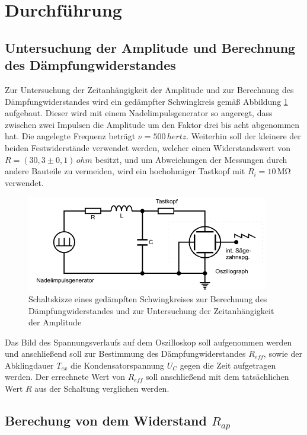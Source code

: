 \section{Durchführung}
\label{sec:Durchführung}

\subsection{Untersuchung der Amplitude und Berechnung des Dämpfungwiderstandes}

Zur Untersuchung der Zeitanhängigkeit der Amplitude und zur Berechnung des Dämpfungwiderstandes
wird ein gedämpfter Schwingkreis gemäß Abbildung \ref{fig:gsk2} aufgebaut. Dieser wird mit einem
Nadelimpulsgenerator so angeregt, dass zwischen zwei Impulsen die Amplitude um den Faktor drei 
bis acht abgenommen hat. Die angelegte Frequenz beträgt $\nu = 500\, \si{hertz}$. Weiterhin
soll der kleinere der beiden Festwiderstände verwendet werden, welcher einen Widerstandswert
von $R = (30,3 \pm 0,1)\, \si{ohm}$ besitzt,
und um Abweichungen der Messungen durch andere Bauteile zu vermeiden, wird ein hochohmiger 
Tastkopf mit $R_i = 10\, \si{\mega\ohm}$ verwendet.

\begin{figure}[H]
  \centering
  \includegraphics{content/aufgabeA.png}
  \caption{Schaltskizze eines gedämpften Schwingkreises zur Berechnung des Dämpfungwiderstandes und zur Untersuchung der Zeitanhängigkeit der Amplitude \cite{sample354}}
  \label{fig:gsk2}
\end{figure}
\noindent
Das Bild des Spannungsverlaufs auf dem Oszilloskop soll aufgenommen werden und anschließend soll
zur Bestimmung des Dämpfungwiderstandes $R_{eff}$, sowie der Abklingdauer $T_{ex}$ die Kondensatorspannung
$U_C$ gegen die Zeit aufgetragen werden. Der errechnete Wert von $R_{eff}$ soll anschließend mit dem
tatsächlichen Wert $R$ aus der Schaltung verglichen werden.



\subsection{Berechung von dem Widerstand $R_{ap}$}

